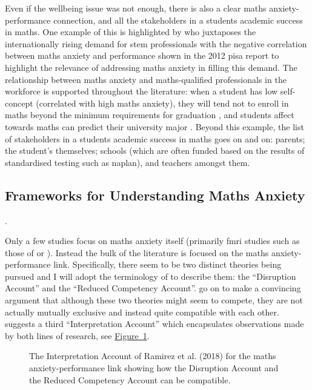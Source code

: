 \documentclass[14pt]{memoir}
\newcommand{\reffig}[1]{\hyperref[fig:#1]{Figure~\ref{fig:#1}}}
\begin{document}
Even if the wellbeing issue was not enough, there is also a clear maths anxiety-performance connection, and all the stakeholders in a students academic success in maths. One example of this is highlighted by  who juxtaposes the internationally rising demand for \gls{stem} professionals with the negative correlation between maths anxiety and performance shown in the 2012 \gls{pisa} report \cite{PISA2013} to highlight the relevance of addressing maths anxiety in filling this demand. The relationship between maths anxiety and maths-qualified professionals in the workforce is supported throughout the literature: when a student has low self-concept (correlated with high maths anxiety), they will tend not to enroll in maths beyond the minimum requirements for graduation \cite{Ashcraft2007book}, and students affect towards maths can predict their university major \cite{LeFevre1992}. Beyond this example, the list of stakeholders in a students academic success in maths goes on and on: parents; the student's themselves; schools (which are often funded based on the results of standardised testing such as \gls{naplan}), and teachers amongst them. 



\subsection*{Frameworks for Understanding Maths Anxiety}.

Only a few studies focus on maths anxiety itself (primarily \gls{fmri} studies such as those of   or ). Instead the bulk of the literature is focused on the maths anxiety-performance link.  Specifically, there seem to be two distinct theories being pursued and I will adopt the terminology of  to describe them: the ``Disruption Account'' and the ``Reduced Competency Account''.  go on to make a convincing argument that although these two theories might seem to compete, they are not actually mutually exclusive and instead quite compatible with each other.  suggests a third ``Interpretation Account'' which encapsulates observations made by both lines of research, see \reffig{ramirez}.

\begin{figure}[b]
\begin{center}
\end{center}
\caption{The Interpretation Account of Ramirez et al. (2018) for the maths anxiety-performance link showing how the Disruption Account and the Reduced Competency Account can be compatible.
\label{fig:ramirez}}
\end{figure}
\end{document}
